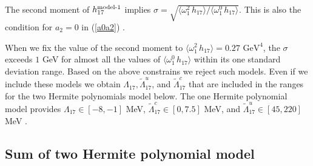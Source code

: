 The second moment of $h^{\mbox{\scriptsize model-1}}_{17}$ implies $\sigma=\sqrt{\langle\omega_1^2\,h_{17}\rangle/\langle\omega_1^0\,h_{17}\rangle}$. This is also the condition for $a_2=0$ in (\ref{a0a2}) \cite{Gunawardana:2019gep}.\par
When we fix the value of the second moment to $\langle\omega_1^2\,h_{17}\rangle=0.27\mbox{ GeV}^4$, the $\sigma$ exceeds $1$ GeV for almost all the values of $\langle\omega_1^0\,h_{17}\rangle$ within its one standard deviation range. Based on the above constrains we reject such models. Even if we include these models we obtain $\Lambda_{17},\tilde\Lambda_{17}^u$, and $\tilde\Lambda_{17}^c$ that are included in the ranges for the two Hermite polynomials model below. The one Hermite polynomial model provides $\Lambda_{17}\in[-8,-1]$ MeV, $\tilde\Lambda_{17}^c\in[0,7.5]$ MeV, and $\tilde\Lambda_{17}^u\in[45,220]$ MeV \cite{Gunawardana:2019gep}.\par

\subsection{Sum of two Hermite polynomial model}

